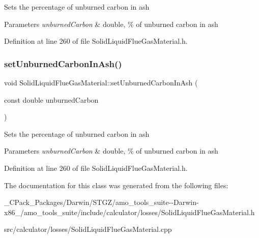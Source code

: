 Sets the percentage of unburned carbon in ash 
\begin{DoxyParams}{Parameters}
{\em unburned\+Carbon} & double, \% of unburned carbon in ash \\
\hline
\end{DoxyParams}


Definition at line 260 of file Solid\+Liquid\+Flue\+Gas\+Material.\+h.

\mbox{\label{class_solid_liquid_flue_gas_material_adf052dd1bdceeab710a4986b1fd874b9}} 
\subsubsection{\texorpdfstring{set\+Unburned\+Carbon\+In\+Ash()}{setUnburnedCarbonInAsh()}\hspace{0.1cm}{\footnotesize\ttfamily [3/3]}}
{\footnotesize\ttfamily void Solid\+Liquid\+Flue\+Gas\+Material\+::set\+Unburned\+Carbon\+In\+Ash (\begin{DoxyParamCaption}\item[{const double}]{unburned\+Carbon }\end{DoxyParamCaption})\hspace{0.3cm}{\ttfamily [inline]}}

Sets the percentage of unburned carbon in ash 
\begin{DoxyParams}{Parameters}
{\em unburned\+Carbon} & double, \% of unburned carbon in ash \\
\hline
\end{DoxyParams}


Definition at line 260 of file Solid\+Liquid\+Flue\+Gas\+Material.\+h.



The documentation for this class was generated from the following files\+:\begin{DoxyCompactItemize}
\item 
\+\_\+\+C\+Pack\+\_\+\+Packages/\+Darwin/\+S\+T\+G\+Z/amo\+\_\+tools\+\_\+suite-\/-\/\+Darwin-\/x86\+\_/amo\+\_\+tools\+\_\+suite/include/calculator/losses/Solid\+Liquid\+Flue\+Gas\+Material.\+h\item 
src/calculator/losses/Solid\+Liquid\+Flue\+Gas\+Material.\+cpp\end{DoxyCompactItemize}
